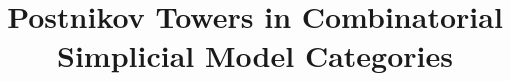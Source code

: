 



\usepackage{subfiles}

\title{Postnikov Towers in Combinatorial Simplicial Model Categories} \date{}
\maketitle

{\footnotesize
  \tableofcontents
}





\printbibliography

\listoftodos

